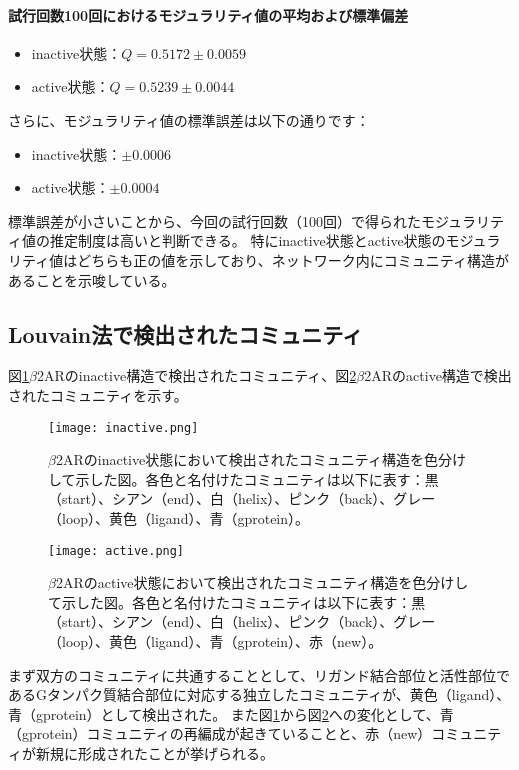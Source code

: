\paragraph{試行回数100回におけるモジュラリティ値の平均および標準偏差}
\begin{itemize}
    \item inactive状態：\( Q = 0.5172 \pm 0.0059 \)
    \item active状態：\( Q = 0.5239 \pm 0.0044 \)
\end{itemize}
さらに、モジュラリティ値の標準誤差は以下の通りです：
\begin{itemize}
    \item inactive状態：\( \pm 0.0006 \)
    \item active状態：\( \pm 0.0004 \)
\end{itemize}

標準誤差が小さいことから、今回の試行回数（100回）で得られたモジュラリティ値の推定制度は高いと判断できる。
特にinactive状態とactive状態のモジュラリティ値はどちらも正の値を示しており、ネットワーク内にコミュニティ構造があることを示唆している。


\subsection{Louvain法で検出されたコミュニティ}

図\ref{fig:inactive}$\beta$2ARのinactive構造で検出されたコミュニティ、図\ref{fig:active}$\beta$2ARのactive構造で検出されたコミュニティを示す。

\begin{figure}[htbp]
    \centering
    \texttt{[image: inactive.png]}
    \caption{$\beta$2ARのinactive状態において検出されたコミュニティ構造を色分けして示した図。各色と名付けたコミュニティは以下に表す：黒（start）、シアン（end）、白（helix）、ピンク（back）、グレー（loop）、黄色（ligand）、青（gprotein）。}
    \label{fig:inactive}
\end{figure}

\begin{figure}[htbp]
    \centering
    \texttt{[image: active.png]}
    \caption{$\beta$2ARのactive状態において検出されたコミュニティ構造を色分けして示した図。各色と名付けたコミュニティは以下に表す：黒（start）、シアン（end）、白（helix）、ピンク（back）、グレー（loop）、黄色（ligand）、青（gprotein）、赤（new）。}
    \label{fig:active}
\end{figure}

まず双方のコミュニティに共通することとして、リガンド結合部位と活性部位であるGタンパク質結合部位に対応する独立したコミュニティが、黄色（ligand）、青（gprotein）として検出された。
また図\ref{fig:inactive}から図\ref{fig:active}への変化として、青（gprotein）コミュニティの再編成が起きていることと、赤（new）コミュニティが新規に形成されたことが挙げられる。

